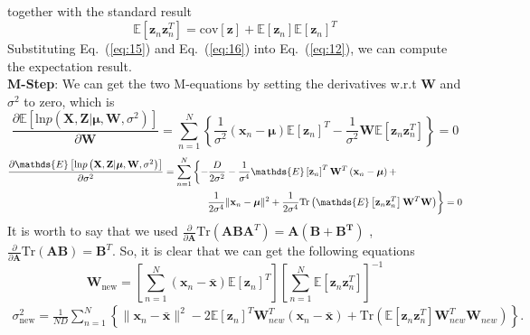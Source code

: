 \documentclass{article}
\begin{document}
	together with the standard result
	\begin{equation}
	\mathds{E}[\mathbf{z}_n\mathbf{z}_n^T] = \text{cov}[\mathbf{z}]+	\mathds{E}[\mathbf{z}_n]\mathds{E}[\mathbf{z}_n]^T\label{eq:16}
	\end{equation}
	Substituting Eq.~(\ref{eq:15}) and Eq.~(\ref{eq:16}) into Eq.~(\ref{eq:12}), we can compute the expectation result.\\
	{\bfseries M-Step}: We can get the two M-equations by setting the derivatives w.r.t $\mathbf{W}$ and $\sigma^2$ to zero, which is
	\begin{equation}
	\frac{\partial\mathds{E}\left[\text{ln}p\left(\mathbf{X,Z}|\boldsymbol{\mu},\mathbf{W},\sigma^2\right)\right]}{\partial\mathbf{W}} = \sum\limits_{n=1}^{N}\left\{\frac{1}{\sigma^2}\left(\mathbf{x}_n-\boldsymbol{\mu}\right)\mathds{E}\left[\mathbf{z}_n\right]^T-\frac{1}{\sigma^2}\mathbf{W}\mathds{E}\left[\mathbf{z}_n\mathbf{z}_n^T\right]\right\}=0
	\end{equation} 
    \begin{align}
	\frac{\partial\mathds{E}\left[\text{ln}p\left(\mathbf{X,Z}|\boldsymbol{\mu},\mathbf{W},\sigma^2\right)\right]}{\partial\sigma^2} = \sum\limits_{n=1}^{N}&\left\{-\frac{D}{2\sigma^2}-\frac{1}{\sigma^4}\mathds{E}\left[\mathbf{z}_n\right]^T\mathbf{W}^T\left(\mathbf{x}_n-\boldsymbol{\mu}\right)+\notag\right.\\
	&\phantom{=\;\;}\left.\frac{1}{2\sigma^4}\|\mathbf{x}_n-\boldsymbol{\mu}\|^2+\frac{1}{2\sigma^4}\text{Tr}\left(\mathds{E}\left[\mathbf{z}_n\mathbf{z}_n^T\right]\mathbf{W}^T\mathbf{W}\right)\right\}=0
	\end{align}
	It is worth to say that we used $\frac{\partial}{\partial\mathbf{A}}\text{Tr}(\mathbf{ABA}^T)=\mathbf{A(B+B^T)}$ , $\frac{\partial}{\partial\mathbf{A}}\text{Tr}(\mathbf{AB})= \mathbf{B}^T$. So, it is clear that we can get the following equations
	\begin{equation}
	\mathbf{W}_{\text{new}}=\left[\sum\limits_{n=1}^{N}\left(\mathbf{x}_n-\bar{\mathbf{x}}\right)\mathds{E}\left[\mathbf{z}_n\right]^T\right]\left[\sum\limits_{n=1}^{N}\mathds{E}\left[\mathbf{z}_n\mathbf{z}_n^T\right]\right]^{-1}
	\end{equation}
	\begin{align}
	\sigma^2_{\text{new}} = \frac{1}{ND}\sum\limits_{n=1}^{N}\left\{\|\mathbf{x}_n-\bar{\mathbf{x}}\|^2-2\mathds{E}\left[\mathbf{z}_n\right]^T\mathbf{W}_{new}^T\left(\mathbf{x}_n-\bar{\mathbf{x}}\right)+\text{Tr}\left(\mathds{E}\left[\mathbf{z}_n\mathbf{z}_n^T\right]\mathbf{W}_{new}^{T}\mathbf{W}_{new}\right)\right\}.
	\end{align}
	  

	
	
		
\end{document}
